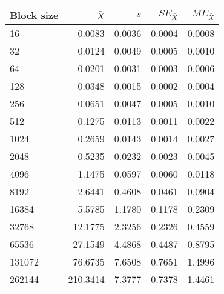\begin{tabular}{lrrrr}\toprule
{\small Block size} & $\bar{X}$ & $s$ & $SE_{\bar{X}}$ & $ME_{\bar{X}}$ \\\midrule
16 & 0.0083 & 0.0036 & 0.0004 & 0.0008\\
32 & 0.0124 & 0.0049 & 0.0005 & 0.0010\\
64 & 0.0201 & 0.0031 & 0.0003 & 0.0006\\
128 & 0.0348 & 0.0015 & 0.0002 & 0.0004\\
256 & 0.0651 & 0.0047 & 0.0005 & 0.0010\\
512 & 0.1275 & 0.0113 & 0.0011 & 0.0022\\
1024 & 0.2659 & 0.0143 & 0.0014 & 0.0027\\
2048 & 0.5235 & 0.0232 & 0.0023 & 0.0045\\
4096 & 1.1475 & 0.0597 & 0.0060 & 0.0118\\
8192 & 2.6441 & 0.4608 & 0.0461 & 0.0904\\
16384 & 5.5785 & 1.1780 & 0.1178 & 0.2309\\
32768 & 12.1775 & 2.3256 & 0.2326 & 0.4559\\
65536 & 27.1549 & 4.4868 & 0.4487 & 0.8795\\
131072 & 76.6735 & 7.6508 & 0.7651 & 1.4996\\
262144 & 210.3414 & 7.3777 & 0.7378 & 1.4461\\
\bottomrule
\end{tabular}
